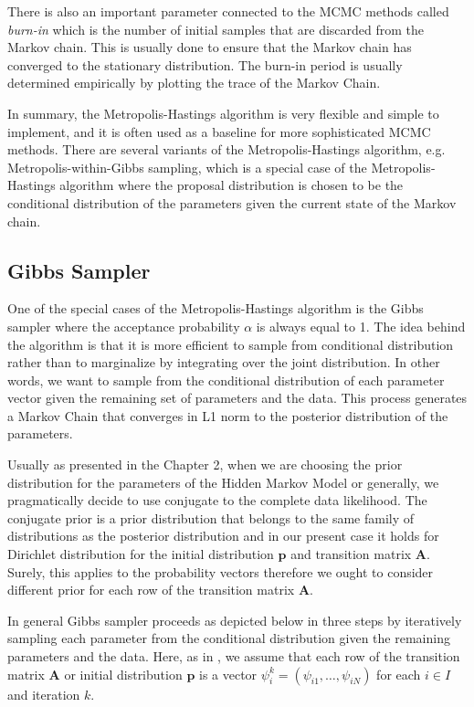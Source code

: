 There is also an important parameter connected to the MCMC methods called \textit{burn-in} which is the number of initial samples that are discarded from the Markov chain. This is usually 
done to ensure that the Markov chain has converged to the stationary distribution. The burn-in period is usually determined empirically by plotting the trace of the Markov Chain.~\citep{Navarro2011}

In summary, the Metropolis-Hastings algorithm is very flexible and simple to implement, and it is often used as a baseline for more sophisticated MCMC methods. 
There are several variants of the Metropolis-Hastings algorithm, e.g. Metropolis-within-Gibbs sampling, which is a special case of the Metropolis-Hastings algorithm where the proposal distribution is chosen to be the conditional distribution of the parameters given the current state of the Markov chain.

\subsection{Gibbs Sampler}

One of the special cases of the Metropolis-Hastings algorithm is the Gibbs sampler where the acceptance probability 
$\alpha$ is always equal to 1. The idea behind the algorithm is that it is more efficient to sample from conditional distribution rather than 
to marginalize by integrating over the joint distribution. In other words, we want to sample from the conditional distribution of each parameter vector given 
the remaining set of parameters and the data. This process generates a Markov Chain that converges in L1 norm to the posterior distribution of the parameters. \citep{Chib1996}

Usually as presented in the Chapter 2, when we are choosing the prior distribution for the parameters of the Hidden Markov Model or generally, we pragmatically
decide to use conjugate to the complete data likelihood. The conjugate prior is a prior distribution that belongs to the same family of distributions 
as the posterior distribution and in our present case it holds for Dirichlet distribution for the initial distribution $\textbf{p}$ and transition matrix $\textbf{A}$.
Surely, this applies to the probability vectors therefore we ought to consider different prior for each row of the transition matrix $\textbf{A}$. \citep{Rydén2008}

In general Gibbs sampler proceeds as depicted below in three steps by iteratively sampling each parameter from the conditional distribution given the remaining parameters 
and the data. Here, as in \citep{Chib1996}, we assume that each row of the transition matrix $\textbf{A}$ or initial distribution $\textbf{p}$ is a vector $\psi_i^k=(\psi_{i1},\ldots,\psi_{iN})$ for each $i \in I$ and iteration $k$.

